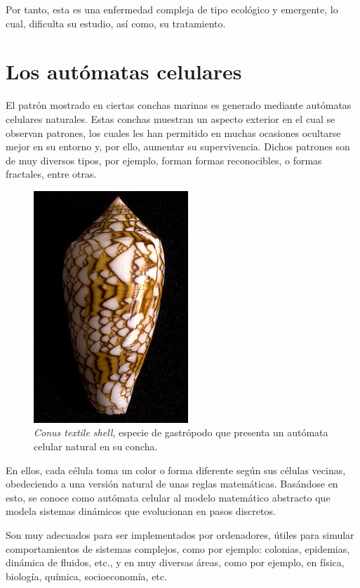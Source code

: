 Por tanto, esta es una enfermedad compleja de tipo ecológico y emergente, lo cual, dificulta su estudio,
así como, su tratamiento.

\section{Los autómatas celulares}

El patrón mostrado en ciertas conchas marinas es generado mediante autómatas celulares naturales.
Estas conchas muestran un aspecto exterior en el cual se observan patrones, los cuales les han
permitido en muchas ocasiones ocultarse mejor en su entorno y, por ello, aumentar su supervivencia.
Dichos patrones son de muy diversos tipos, por ejemplo, forman formas reconocibles, o formas fractales,
entre otras.

\begin{figure}[h]
\centering
\includegraphics[scale=2]{figures/Conustextile}
\caption{\textit{Conus textile shell}, especie de gastrópodo que presenta un autómata celular natural en su concha.}
\end{figure}

En ellos, cada célula toma un color o forma diferente según sus células vecinas, obedeciendo
a una versión natural de unas reglas matemáticas. Basándose en esto, se conoce como autómata celular
al modelo matemático abstracto que modela sistemas dinámicos que evolucionan en pasos discretos.

Son muy adecuados para ser implementados por ordenadores, útiles para simular comportamientos de sistemas
complejos, como por ejemplo: colonias, epidemias, dinámica de fluidos, etc., y en muy diversas áreas, como por ejemplo,
en física, biología, química, socioeconomía, etc.

